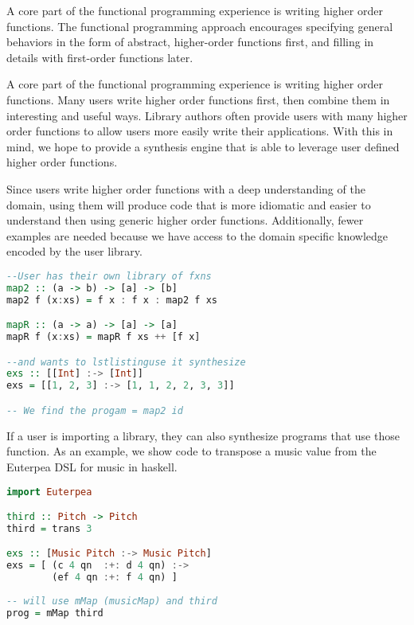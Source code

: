 A core part of the functional programming experience is writing higher order functions. The functional programming approach encourages specifying general behaviors in the form of abstract, higher-order functions first, and filling in details with first-order functions later.

A core part of the functional programming experience is writing higher order functions. Many users write higher order functions first, then combine them in interesting and useful ways. Library authors often provide users with many higher order functions to allow users more easily write their applications. With this in mind, we hope to provide a synthesis engine that is able to leverage user defined higher order functions.

Since users write higher order functions with a deep understanding of the domain, using them will produce code that is more idiomatic and easier to understand then using generic higher order functions. Additionally, fewer examples are needed because we have access to the domain specific knowledge encoded by the user library.

\begin{lstlisting}[language=haskell]
--User has their own library of fxns
map2 :: (a -> b) -> [a] -> [b]
map2 f (x:xs) = f x : f x : map2 f xs

mapR :: (a -> a) -> [a] -> [a]
mapR f (x:xs) = mapR f xs ++ [f x]

--and wants to lstlistinguse it synthesize
exs :: [[Int] :-> [Int]]
exs = [[1, 2, 3] :-> [1, 1, 2, 2, 3, 3]]

-- We find the progam = map2 id
\end{lstlisting}


If a user is importing a library, they can also synthesize programs that use those function. As an example, we show code to transpose a music value from the Euterpea DSL for music in haskell.

\begin{lstlisting}[language=haskell]
import Euterpea

third :: Pitch -> Pitch
third = trans 3

exs :: [Music Pitch :-> Music Pitch]
exs = [ (c 4 qn  :+: d 4 qn) :->
        (ef 4 qn :+: f 4 qn) ]
        
-- will use mMap (musicMap) and third
prog = mMap third
\end{lstlisting}
